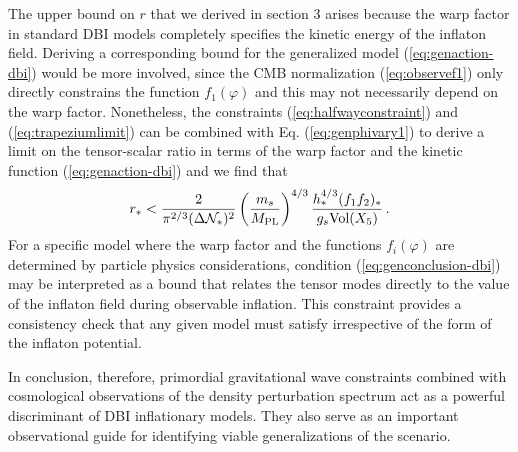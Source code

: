 The upper bound on $r$ that we derived in section 3 arises 
because the warp factor in standard DBI models 
completely specifies the kinetic 
energy of the inflaton field. Deriving a corresponding bound for 
the generalized model (\ref{eq:genaction-dbi}) would be more involved, 
since the CMB normalization (\ref{eq:observef1}) only 
directly constrains the function 
$f_1 (\varphi )$ and this may not necessarily depend on the warp factor. 
Nonetheless, the constraints (\ref{eq:halfwayconstraint}) and
(\ref{eq:trapeziumlimit}) can be 
combined with Eq. (\ref{eq:genphivary1}) to derive a limit 
on the tensor-scalar ratio in terms of the warp factor and the 
kinetic function (\ref{eq:genaction-dbi}) and we find that  
% 
\begin{equation}
\label{eq:genconclusion-dbi}
r_* < \frac{2}{\pi^{2/3} ( \Delta \mathcal{N}_*)^2}
\left( \frac{m_s}{M_{\mathrm{PL}}} \right)^{4/3} 
\frac{h_*^{4/3} (f_1f_2)_*}{g_s\mathrm{Vol}(X_5)}  \,.
\end{equation}
% 
For a specific model where the warp factor and 
the functions $f_i (\varphi )$ are determined by particle 
physics considerations,   
condition (\ref{eq:genconclusion-dbi}) 
may be interpreted as a bound that relates 
the tensor modes directly to the value of the inflaton field during observable 
inflation. This constraint provides a consistency 
check that any given model must satisfy 
irrespective of the form of the inflaton potential. 


In conclusion, therefore, primordial gravitational wave constraints 
combined with cosmological observations of the density perturbation
spectrum act as a powerful discriminant of DBI inflationary models. 
They also serve as an important 
observational guide for identifying viable 
generalizations of the scenario. 
